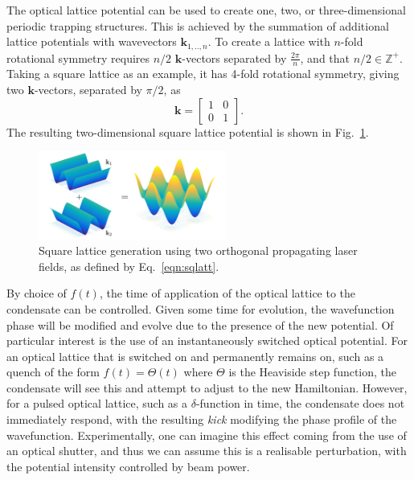 The optical lattice potential can be used to create one, two, or three-dimensional periodic trapping structures. This is achieved by the summation of additional lattice potentials with wavevectors $\mathbf{k}_{1,..,n}$. To create a lattice with $n$-fold rotational symmetry requires $n/2$ $\mathbf{k}$-vectors separated by $\frac{2\pi}{n}$, and that $n/2 \in \mathbb{Z}^{+}$. Taking a square lattice as an example, it has 4-fold rotational symmetry, giving two $\mathbf{k}$-vectors, separated by $\pi/2$, as
\begin{equation}
    \mathbf{k} =
    \begin{bmatrix}
     1 & 0 \\
     0 & 1
    \end{bmatrix}.\label{eqn:sqlatt}
\end{equation}
The resulting two-dimensional square lattice potential is shown in Fig.~\ref{fig:cos2xy}.
\begin{figure}\centering
    \includegraphics[width=0.55\textwidth]{./Images/ch4_vtx/VOPT/squarelatt}
    \caption{Square lattice generation using two orthogonal propagating laser fields, as defined by Eq.~\ref{eqn:sqlatt}.}\label{fig:cos2xy}
\end{figure}
By choice of $f(t)$, the time of application of the optical lattice to the condensate can be controlled. Given some time for evolution, the wavefunction phase will be modified and evolve due to the presence of the new potential. Of particular interest is the use of an instantaneously switched optical potential. For an optical lattice that is switched on and permanently remains on, such as a quench of the form $f(t) = \Theta(t)$ where $\Theta$ is the Heaviside step function, the condensate will see this and attempt to adjust to the new Hamiltonian. However, for a pulsed optical lattice, such as a $\delta$-function in time, the condensate does not immediately respond, with the resulting \textit{kick} modifying the phase profile of the wavefunction. Experimentally, one can imagine this effect coming from the use of an optical shutter, and thus we can assume this is a realisable perturbation, with the potential intensity controlled by beam power.

